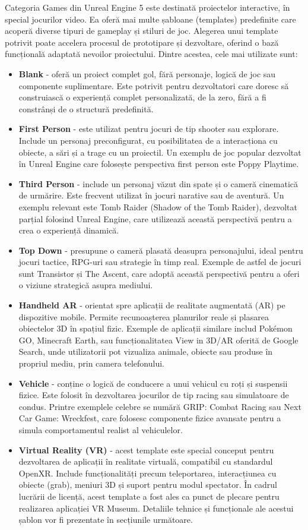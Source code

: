 Categoria Games din Unreal Engine 5 este destinată proiectelor interactive, în special jocurilor video. Ea oferă mai multe șabloane (templates) predefinite care acoperă diverse tipuri de gameplay și stiluri de joc. Alegerea unui template potrivit poate accelera procesul de prototipare și dezvoltare, oferind o bază funcțională adaptată nevoilor proiectului. Dintre acestea, cele mai utilizate sunt:

\begin{itemize}
\item \textbf{Blank} - oferă un proiect complet gol, fără personaje, logică de joc sau componente suplimentare. Este potrivit pentru dezvoltatori care doresc să construiască o experiență complet personalizată, de la zero, fără a fi constrânși de o structură predefinită.
\item \textbf{First Person} - este utilizat pentru jocuri de tip shooter sau explorare. Include un personaj preconfigurat, cu posibilitatea de a interacționa cu obiecte, a sări și a trage cu un proiectil. Un exemplu de joc popular dezvoltat în Unreal Engine care folosește perspectiva first person este Poppy Playtime.
\item \textbf{Third Person} - include un personaj văzut din spate și o cameră cinematică de urmărire. Este frecvent utilizat în jocuri narative sau de aventură. Un exemplu relevant este Tomb Raider (Shadow of the Tomb Raider), dezvoltat parțial folosind Unreal Engine, care utilizează această perspectivă pentru a crea o experiență dinamică.
\item \textbf{Top Down} - presupune o cameră plasată deasupra personajului, ideal pentru jocuri tactice, RPG-uri sau strategie în timp real. Exemple de astfel de jocuri sunt Transistor și The Ascent, care adoptă această perspectivă pentru a oferi o viziune strategică asupra mediului.
\item \textbf{Handheld AR} - orientat spre aplicații de realitate augmentată (AR) pe dispozitive mobile. Permite recunoașterea planurilor reale și plasarea obiectelor 3D în spațiul fizic. Exemple de aplicații similare includ Pokémon GO, Minecraft Earth, sau funcționalitatea View in 3D/AR oferită de Google Search, unde utilizatorii pot vizualiza animale, obiecte sau produse în propriul mediu, prin camera telefonului.
\item \textbf{Vehicle} - conține o logică de conducere a unui vehicul cu roți și suspensii fizice. Este folosit în dezvoltarea jocurilor de tip racing sau simulatoare de condus. Printre exemplele celebre se numără GRIP: Combat Racing sau Next Car Game: Wreckfest, care folosesc componente fizice avansate pentru a simula comportamentul realist al vehiculelor.
\item \textbf{Virtual Reality (VR)} - acest template este special conceput pentru dezvoltarea de aplicații în realitate virtuală, compatibil cu standardul OpenXR. Include funcționalități precum teleportarea, interacțiunea cu obiecte (grab), meniuri 3D și suport pentru modul spectator. În cadrul lucrării de licență, acest template a fost ales ca punct de plecare pentru realizarea aplicației VR Museum. Detaliile tehnice și funcționale ale acestui șablon vor fi prezentate în secțiunile următoare.


\end{itemize}
